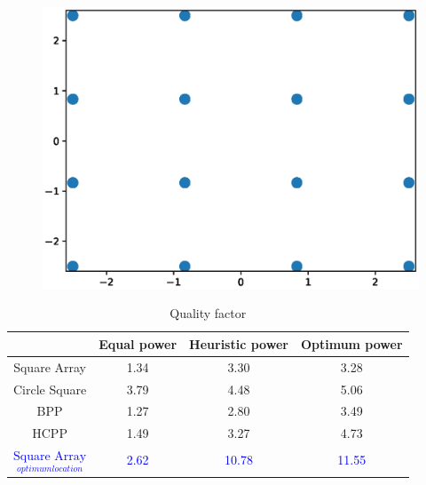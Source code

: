 \documentclass[slidestop,usepdftitle=false]{gvvslides}
\begin{document}
\begin{frame}
\vfill
\begin{figure}
\includegraphics[scale=.25]{sq_opt_loc}
\end{figure}
\vfill
\begin{table}[]
\centering
\caption{Quality factor}
\begin{tabular}{|c|c|c|c|}
 \hline
 & Equal power & Heuristic power & Optimum power   \\
 \hline  
Square Array & 1.34 & 3.30 & 3.28   \\
 \hline 
Circle Square & 3.79 & 4.48 &  5.06 \\
 \hline
BPP & 1.27 & 2.80 &  3.49 \\
 \hline
HCPP  & 1.49  & 3.27 &  4.73 \\
 \hline
\textcolor{blue}{$\underset{optimum location}{\text{Square Array}}$} & \textcolor{blue}{2.62}  & \textcolor{blue}{10.78} &  \textcolor{blue}{11.55} \\
 \hline
\end{tabular}
\end{table}
\vfill
\end{frame}
\end{document}
